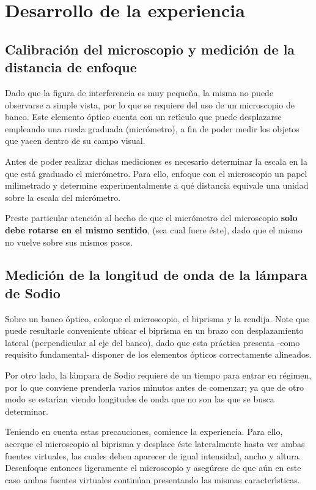 \documentclass[laboratorio]{guia}
\begin{document}
\section{Desarrollo de la experiencia}

\subsection{Calibraci\'on del microscopio y medici\'on de la distancia de
enfoque}

Dado que la figura de interferencia es muy peque\~na, la misma no puede
observarse a simple vista, por lo que se requiere del uso de un microscopio de
banco. Este elemento \'optico cuenta con un ret\'\i culo que puede desplazarse
empleando una rueda graduada (micr\'ometro), a fin de poder medir los objetos
que yacen dentro de su campo visual.

Antes de poder realizar dichas mediciones es necesario determinar la escala en
la que est\'a graduado el micr\'ometro. Para ello, enfoque con el microscopio
un papel milimetrado y determine experimentalmente a qu\'e distancia equivale
una unidad sobre la escala del micr\'ometro.

Preste particular atenci\'on al hecho de que el micr\'ometro del microscopio
{\bf solo debe rotarse en el mismo sentido}, (sea cual fuere \'este), dado que
el mismo no vuelve sobre sus mismos pasos. 


\subsection{Medici\'on de la longitud de onda de la l\'ampara de Sodio}

Sobre un banco \'optico, coloque el microscopio, el biprisma y la rendija. Note
que puede resultarle conveniente 
ubicar el biprisma en un brazo con desplazamiento lateral
(perpendicular al eje del banco), dado que esta pr\'actica presenta -como
requisito fundamental- disponer de los elementos \'opticos correctamente
alineados. 

Por otro lado, la l\'ampara de Sodio requiere de un tiempo para entrar en
r\'egimen, por lo que conviene prenderla varios minutos antes de comenzar; ya
que de otro modo se estar\'\i an viendo longitudes de onda que no son las que
se busca determinar.

Teniendo en cuenta estas precauciones, comience la experiencia. Para ello,
acerque el microscopio al biprisma y desplace \'este lateralmente hasta ver
ambas fuentes virtuales, las cuales deben aparecer de igual intensidad, ancho
y altura. Desenfoque entonces ligeramente el microscopio y aseg\'urese de que
a\'un en este caso ambas fuentes virtuales contin\'uan presentando las mismas
caracter\'\i sticas.
\end{document}
